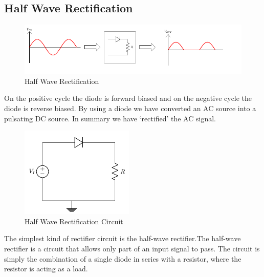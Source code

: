 		\subsection{Half Wave Rectification}
			\begin{figure}[h]
				\centering
				\includegraphics[width=0.9\linewidth]{img/exp6/2}
				\caption{Half Wave Rectification}
				\label{fig:rfhw}
			\end{figure}
			On the positive cycle the diode is forward biased and on the negative cycle the diode is reverse biased. By using a diode we have converted an AC source into a pulsating DC source. In summary we have ‘rectified’ the AC signal.
			\begin{figure}[h]
				\centering
				\includegraphics[width=0.3\linewidth]{img/exp6/3}
				\caption{Half Wave Rectification Circuit}
				\label{fig:rfhwc}
			\end{figure}
			The simplest kind of rectifier circuit is the half-wave rectifier.The half-wave rectifier is a circuit that allows only part of an input signal to pass. The circuit is simply the combination of a single diode in series with a resistor, where the resistor is acting as a load.
		
